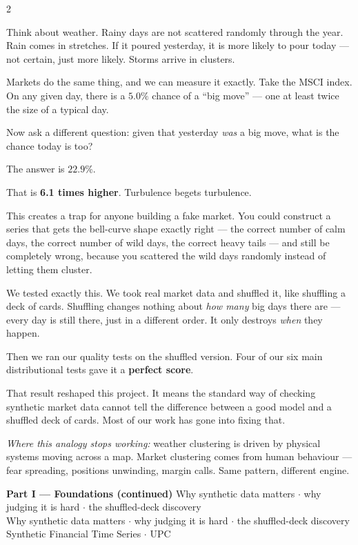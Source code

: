 \documentclass[10pt]{article}
\newcommand{\amberbox}[2]{\begin{tcolorbox}[mybox={Amber}{ABg},title={#1}]#2\end{tcolorbox}}
\newcommand{\pagehead}[2]{%
  \begin{tcolorbox}[enhanced,arc=0pt,outer arc=0pt,boxrule=0pt,
    colback=Navy,colframe=Navy,
    top=5pt,bottom=5pt,left=8pt,right=8pt,
    before skip=0pt,after skip=10pt]
  {\color{white}\large\bfseries #1}%
  \ifx\relax#2\relax\else\\[1pt]{\color{blue!30!white}\small #2}\fi
  \hfill{\color{blue!20!white}\footnotesize Synthetic Financial Time Series $\cdot$ UPC}
  \end{tcolorbox}}
\begin{document}
\begin{multicols}{2}
\columnbreak

\amberbox{4\quad Storms Cluster}{%
Think about weather. Rainy days are not scattered randomly through the year. Rain comes in stretches. If it poured yesterday, it is more likely to pour today --- not certain, just more likely. Storms arrive in clusters.

Markets do the same thing, and we can measure it exactly. Take the MSCI index. On any given day, there is a $5.0\%$ chance of a ``big move'' --- one at least twice the size of a typical day.

Now ask a different question: given that yesterday \emph{was} a big move, what is the chance today is too?

\medskip
The answer is $\mathbf{22.9\%}$.

\medskip
That is \textbf{6.1 times higher}. Turbulence begets turbulence.

This creates a trap for anyone building a fake market. You could construct a series that gets the bell-curve shape exactly right --- the correct number of calm days, the correct number of wild days, the correct heavy tails --- and still be completely wrong, because you scattered the wild days randomly instead of letting them cluster.

We tested exactly this. We took real market data and shuffled it, like shuffling a deck of cards. Shuffling changes nothing about \emph{how many} big days there are --- every day is still there, just in a different order. It only destroys \emph{when} they happen.

Then we ran our quality tests on the shuffled version. Four of our six main distributional tests gave it a \textbf{perfect score}.

That result reshaped this project. It means the standard way of checking synthetic market data cannot tell the difference between a good model and a shuffled deck of cards. Most of our work has gone into fixing that.

\smallskip
\textit{Where this analogy stops working:} weather clustering is driven by physical systems moving across a map. Market clustering comes from human behaviour --- fear spreading, positions unwinding, margin calls. Same pattern, different engine.}

\end{multicols}

\clearpage

\pagehead{Part I --- Foundations (continued)}
         {Why synthetic data matters $\cdot$ why judging it is hard $\cdot$ the shuffled-deck discovery}
\end{document}
